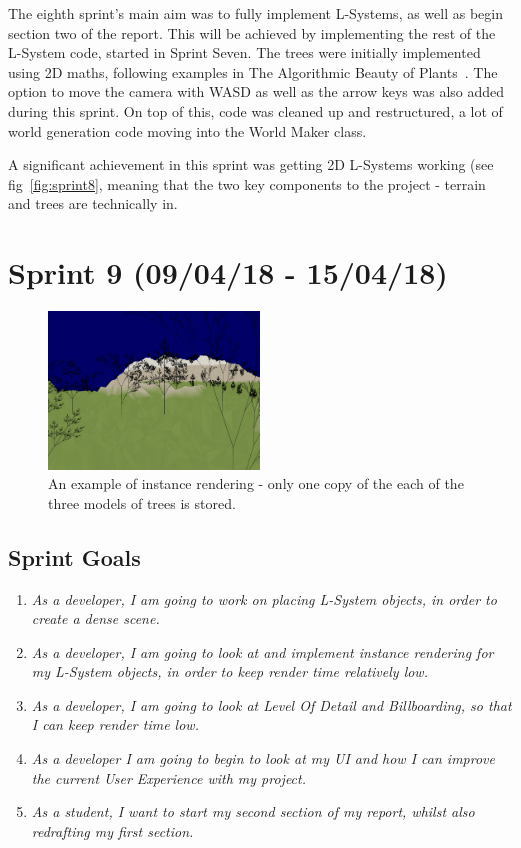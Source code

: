 \documentclass[a4paper,10pt]{report}
\begin{document}
The eighth sprint's main aim was to fully implement L-Systems, as well as begin section two of the report. This will be achieved by implementing the rest of the L-System code, started in Sprint Seven. The trees were initially implemented using 2D maths, following examples in The Algorithmic Beauty of Plants~\cite{prusinkiewicz2012algorithmic}. The option to move the camera with WASD as well as the arrow keys was also added during this sprint. On top of this, code was cleaned up and restructured, a lot of world generation code moving into the World Maker class.

A significant achievement in this sprint was getting 2D L-Systems working (see fig~\ref{fig:sprint8}, meaning that the two key components to the project - terrain and trees are technically in. 


\clearpage
\section{Sprint 9 (09/04/18 -  15/04/18)}

\begin{figure}[h!]
    \centering
  \includegraphics[width=0.5\textwidth]{Images/Sprint-Images/Sprint9-1.png}
 \caption{An example of instance rendering - only one copy of the each of the three models of trees is stored.}
 \label{fig:sprint9-1}
\end{figure}

\subsection{Sprint Goals}
\begin{enumerate}
    \item \textit{ As a developer, I am going to work on placing L-System objects, in order to create a dense scene.}

    \item \textit{ As a developer, I am going to look at and implement instance rendering for my L-System objects, in order to keep render time relatively low.}

    \item \textit{ As a developer, I am going to look at Level Of Detail and Billboarding, so that I can keep render time low.}

    \item \textit{ As a developer I am going to begin to look at my UI and how I can improve the current User Experience with my project.}

    \item \textit{ As a student, I want to start my second section of my report, whilst also redrafting my first section. }
\end{enumerate}
\end{document}
